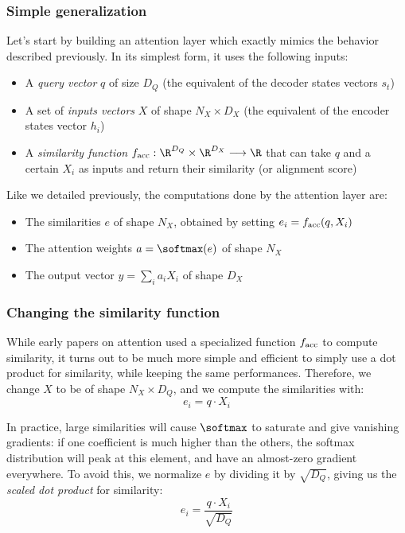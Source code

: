 \subsubsection{Simple generalization}
Let's start by building an attention layer which exactly mimics the behavior described previously. In its simplest form, it uses the following inputs:
\begin{itemize}
    \item A \emph{query vector} $q$ of size $D_Q$ (the equivalent of the decoder states vectors $s_t$)
    \item A set of \emph{inputs vectors} $X$ of shape $N_X\times D_X$ (the equivalent of the encoder states vector $h_i$)
    \item A \emph{similarity function} $f_{\textnormal{acc}}:\R^{D_Q}\times\R^{D_X} \longrightarrow \R$ that can take $q$ and a certain $X_i$ as inputs and return their similarity (or alignment score)
\end{itemize}
Like we detailed previously, the computations done by the attention layer are:
\begin{itemize}
    \item The similarities $e$ of shape $N_X$, obtained by setting $e_i = f_{\textnormal{acc}}(q, X_i)$
    \item The attention weights $a=\softmax(e)$ of shape $N_X$
    \item The output vector $y = \sum_i a_i X_i$ of shape $D_X$
\end{itemize}

\subsubsection{Changing the similarity function}
While early papers on attention used a specialized function $f_{\textnormal{acc}}$ to compute similarity, it turns out to be much more simple and efficient to simply use a dot product for similarity, while keeping the same performances. Therefore, we change $X$ to be of shape $N_X\times D_Q$, and we compute the similarities with:
\begin{equation*}
    e_i = q\cdot X_i
\end{equation*}

In practice, large similarities will cause $\softmax$ to saturate and give vanishing gradients: if one coefficient is much higher than the others, the softmax distribution will peak at this element, and have an almost-zero gradient everywhere. To avoid this, we normalize $e$ by dividing it by $\sqrt{D_Q}$, giving us the \emph{scaled dot product} for similarity:
\begin{equation*}
    e_i = \frac{q\cdot X_i}{\sqrt{D_Q}}
\end{equation*}

